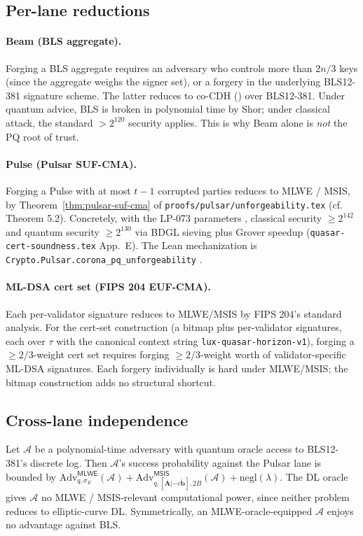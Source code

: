 \subsection{Per-lane reductions}

\paragraph{Beam (BLS aggregate).} Forging a BLS aggregate requires an adversary who controls more than $2n/3$ keys (since the aggregate weighs the signer set), or a forgery in the underlying BLS12-381 signature scheme. The latter reduces to co-CDH (\cite{boneh2001short}) over BLS12-381. Under quantum advice, BLS is broken in polynomial time by Shor; under classical attack, the standard $> 2^{120}$ security applies. This is why Beam alone is \emph{not} the PQ root of trust.

\paragraph{Pulse (Pulsar SUF-CMA).} Forging a Pulse with at most $t-1$ corrupted parties reduces to MLWE / MSIS, by Theorem~\ref{thm:pulsar-suf-cma} of \texttt{proofs/pulsar/unforgeability.tex} (cf. \cite{luxpulsar} Theorem 5.2). Concretely, with the LP-073 parameters \cite{luxpulsar}, classical security $\geq 2^{142}$ and quantum security $\geq 2^{130}$ via BDGL sieving plus Grover speedup (\texttt{quasar-cert-soundness.tex} App.~E). The Lean mechanization is \texttt{Crypto.Pulsar.corona\_pq\_unforgeability} \cite{leancrypto}.

\paragraph{ML-DSA cert set (FIPS 204 EUF-CMA).} Each per-validator signature reduces to MLWE/MSIS by FIPS 204's standard analysis. For the cert-set construction (a bitmap plus per-validator signatures, each over $\tau$ with the canonical context string \texttt{lux-quasar-horizon-v1}), forging a $\geq 2/3$-weight cert set requires forging $\geq 2/3$-weight worth of validator-specific ML-DSA signatures. Each forgery individually is hard under MLWE/MSIS; the bitmap construction adds no structural shortcut.

\subsection{Cross-lane independence}

\begin{lemma}
\label{lem:lane-independence}
Let $\mathcal{A}$ be a polynomial-time adversary with quantum oracle access to BLS12-381's discrete log. Then $\mathcal{A}$'s success probability against the Pulsar lane is bounded by $\mathrm{Adv}^{\mathsf{MLWE}}_{q,\sigma_E}(\mathcal{A}) + \mathrm{Adv}^{\mathsf{MSIS}}_{q, [\mathbf{A}|-c\tilde{\mathbf{b}}], 2B}(\mathcal{A}) + \mathrm{negl}(\lambda)$. The DL oracle gives $\mathcal{A}$ no MLWE / MSIS-relevant computational power, since neither problem reduces to elliptic-curve DL. Symmetrically, an MLWE-oracle-equipped $\mathcal{A}$ enjoys no advantage against BLS.
\end{lemma}

